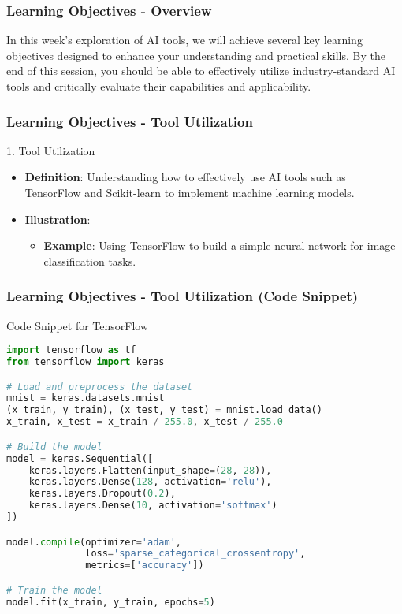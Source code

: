 \documentclass[aspectratio=169]{beamer}
\begin{document}
\begin{frame}
    \frametitle{Learning Objectives - Overview}
    In this week's exploration of AI tools, we will achieve several key learning objectives designed to enhance your understanding and practical skills. By the end of this session, you should be able to effectively utilize industry-standard AI tools and critically evaluate their capabilities and applicability.
\end{frame}

\begin{frame}
    \frametitle{Learning Objectives - Tool Utilization}
    \begin{block}{1. Tool Utilization}
        \begin{itemize}
            \item \textbf{Definition}: Understanding how to effectively use AI tools such as TensorFlow and Scikit-learn to implement machine learning models.
            \item \textbf{Illustration}:
                \begin{itemize}
                    \item \textbf{Example}: Using TensorFlow to build a simple neural network for image classification tasks.
                \end{itemize}
        \end{itemize}
    \end{block}
\end{frame}

\begin{frame}[fragile]
    \frametitle{Learning Objectives - Tool Utilization (Code Snippet)}
    \begin{block}{Code Snippet for TensorFlow}
        \begin{lstlisting}[language=Python]
import tensorflow as tf
from tensorflow import keras

# Load and preprocess the dataset
mnist = keras.datasets.mnist
(x_train, y_train), (x_test, y_test) = mnist.load_data()
x_train, x_test = x_train / 255.0, x_test / 255.0

# Build the model
model = keras.Sequential([
    keras.layers.Flatten(input_shape=(28, 28)),
    keras.layers.Dense(128, activation='relu'),
    keras.layers.Dropout(0.2),
    keras.layers.Dense(10, activation='softmax')
])

model.compile(optimizer='adam',
              loss='sparse_categorical_crossentropy',
              metrics=['accuracy'])

# Train the model
model.fit(x_train, y_train, epochs=5)
        \end{lstlisting}
    \end{block}
\end{frame}
\end{document}
